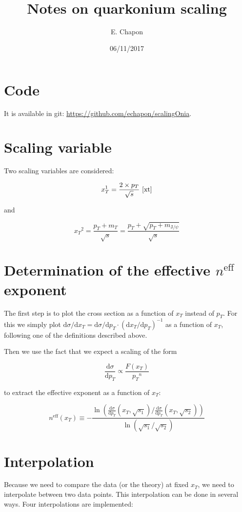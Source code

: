 \documentclass[a4paper,10pt]{article}
\author{E. Chapon}
\title{Notes on quarkonium scaling}
\date{06/11/2017}
\newcommand{\Jpsi}{\ensuremath{\text{J}/\psi}\xspace}
\newcommand{\xt}{\ensuremath{x_T}\xspace}
\newcommand{\pt}{\ensuremath{p_T}\xspace}
\newcommand{\mt}{\ensuremath{m_T}\xspace}
\newcommand{\sqrts}{\ensuremath{\sqrt{s}}\xspace}
\newcommand{\dd}{\ensuremath{\text{d}}\xspace}
\begin{document}
 \section{Code}
 It is available in git: \url{https://github.com/echapon/scalingOnia}.

 \section{Scaling variable}
 
 Two scaling variables are considered:
 
 \begin{equation}
  \xt^1 = \frac{2 \times \pt}{\sqrts}~\cite{xt}
 \end{equation}
 
 and
 
 \begin{equation}
  \xt^2 = \frac{\pt + \mt}{\sqrts} = \frac{\pt + \sqrt{\pt + m_{\Jpsi}}}{\sqrts}
 \end{equation}
 
 \section{Determination of the effective $n^\text{eff}$ exponent}
 
 The first step is to plot the cross section as a function of \xt instead of \pt. For this we simply plot $\dd \sigma / \dd \xt = \dd \sigma / \dd \pt \cdot \left(\dd \xt / \dd \pt\right)^{-1}$ as a function of \xt, following one of the definitions described above.
 
 Then we use the fact that we expect a scaling of the form 
 
 \begin{equation}
  \frac{\dd \sigma}{\dd \pt} \propto \frac{F(\xt)}{\pt^n}
 \end{equation}

 to extract the effective exponent as a function of \xt:
 
 \begin{equation}
  n^\text{eff} (\xt) \equiv - \frac{\ln \left(\frac{\dd \sigma}{\dd \pt}(\xt, \sqrt{s_1}) / \frac{\dd \sigma}{\dd \pt}(\xt, \sqrt{s_2}) \right)}{\ln\left(\sqrt{s_1}/\sqrt{s_2}\right)}
 \end{equation}

 
 \section{Interpolation}
 Because we need to compare the data (or the theory) at fixed \xt, we need to interpolate between two data points. This interpolation can be done in several ways. Four interpolations
 are implemented:
 
\end{document}
